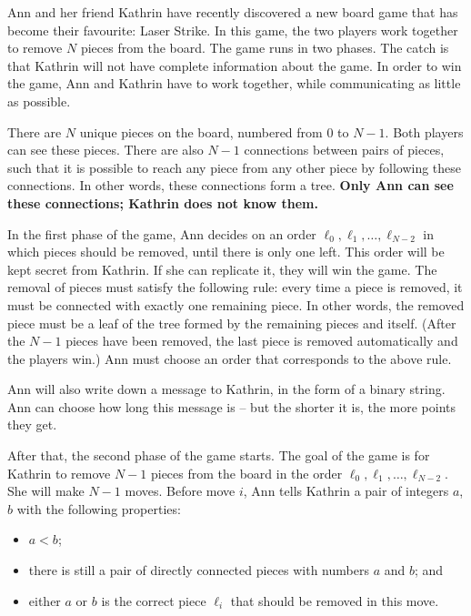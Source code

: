 
Ann and her friend Kathrin have recently discovered a new board game that has become their favourite: Laser Strike.
In this game, the two players work together to remove $N$ pieces from the board.
The game runs in two phases.
The catch is that Kathrin will not have complete information about the game.
In order to win the game, Ann and Kathrin have to work together, while communicating as little as possible.

There are $N$ unique pieces on the board, numbered from $0$ to $N-1$. 
Both players can see these pieces.
There are also $N-1$ connections between pairs of pieces, such that it is possible to reach any piece from any other piece by following these connections.
In other words, these connections form a tree.
\textbf{Only Ann can see these connections; Kathrin does not know them.}

In the first phase of the game, Ann decides on an order $\ell_0, \ell_1, \ldots, \ell_{N-2}$ in which pieces should be removed, until there is only one left. 
This order will be kept secret from Kathrin. If she can replicate it, they will win the game.
The removal of pieces must satisfy the following rule: every time a piece is removed, it must be connected with exactly one remaining piece.
In other words, the removed piece must be a leaf of the tree formed by the remaining pieces and itself.
(After the $N-1$ pieces have been removed, the last piece is removed automatically and the players win.)
Ann must choose an order that corresponds to the above rule.

Ann will also write down a message to Kathrin, in the form of a binary string.
Ann can choose how long this message is -- but the shorter it is, the more points they get.

After that, the second phase of the game starts.
The goal of the game is for Kathrin to remove $N-1$ pieces from the board in the order $\ell_0, \ell_1, \ldots, \ell_{N-2}$.
She will make $N-1$ moves.
Before move $i$, Ann tells Kathrin a pair of integers $a$, $b$ with the following properties:

\begin{itemize}
\item $a < b$;
\item there is still a pair of directly connected pieces with numbers $a$ and $b$; and
\item either $a$ or $b$ is the correct piece $\ell_i$ that should be removed in this move.
\end{itemize}

